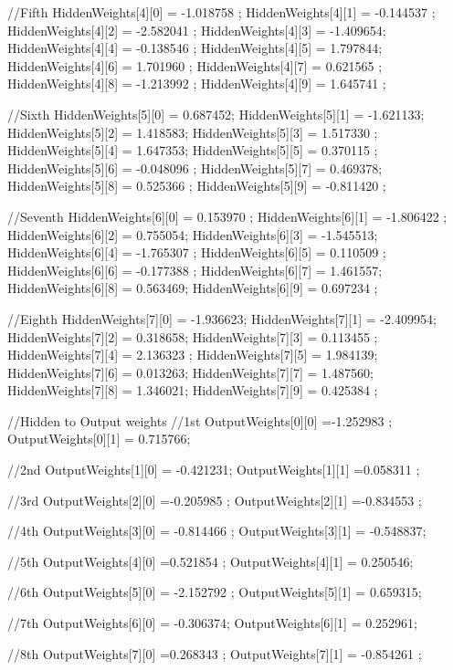 \documentclass[14pt,a4paper]{extarticle}
\begin{document}
\begin{spverbatim}
  //Fifth
  HiddenWeights[4][0] = -1.018758 ;
  HiddenWeights[4][1] = -0.144537 ;
  HiddenWeights[4][2] = -2.582041 ;
  HiddenWeights[4][3] =  -1.409654;
  HiddenWeights[4][4] = -0.138546 ;
  HiddenWeights[4][5] = 1.797844;
  HiddenWeights[4][6] = 1.701960 ;
  HiddenWeights[4][7] = 0.621565 ;
  HiddenWeights[4][8] = -1.213992 ;
  HiddenWeights[4][9] = 1.645741 ;

  //Sixth
  HiddenWeights[5][0] =  0.687452;
  HiddenWeights[5][1] =  -1.621133;
  HiddenWeights[5][2] =  1.418583;
  HiddenWeights[5][3] = 1.517330 ;
  HiddenWeights[5][4] =  1.647353;
  HiddenWeights[5][5] = 0.370115 ;
  HiddenWeights[5][6] = -0.048096 ;
  HiddenWeights[5][7] =  0.469378;
  HiddenWeights[5][8] = 0.525366 ;
  HiddenWeights[5][9] = -0.811420 ;

  //Seventh
  HiddenWeights[6][0] = 0.153970 ;
  HiddenWeights[6][1] = -1.806422 ;
  HiddenWeights[6][2] =  0.755054;
  HiddenWeights[6][3] =  -1.545513;
  HiddenWeights[6][4] = -1.765307 ;
  HiddenWeights[6][5] = 0.110509 ;
  HiddenWeights[6][6] = -0.177388 ;
  HiddenWeights[6][7] =  1.461557;
  HiddenWeights[6][8] =  0.563469;
  HiddenWeights[6][9] = 0.697234 ;

  //Eighth
  HiddenWeights[7][0] =  -1.936623;
  HiddenWeights[7][1] =  -2.409954;
  HiddenWeights[7][2] =  0.318658;
  HiddenWeights[7][3] = 0.113455 ;
  HiddenWeights[7][4] = 2.136323 ;
  HiddenWeights[7][5] =  1.984139;
  HiddenWeights[7][6] =  0.013263;
  HiddenWeights[7][7] =  1.487560;
  HiddenWeights[7][8] =  1.346021;
  HiddenWeights[7][9] = 0.425384 ;
  
  //Hidden to Output weights
  //1st
  OutputWeights[0][0] =-1.252983 ;
  OutputWeights[0][1] = 0.715766;

  //2nd
  OutputWeights[1][0] = -0.421231;
  OutputWeights[1][1] =0.058311 ;

  //3rd
  OutputWeights[2][0] =-0.205985 ;
  OutputWeights[2][1] =-0.834553 ;

  //4th
  OutputWeights[3][0] = -0.814466 ;
  OutputWeights[3][1] = -0.548837;

  //5th
  OutputWeights[4][0] =0.521854 ;
  OutputWeights[4][1] = 0.250546;

  //6th
  OutputWeights[5][0] = -2.152792 ;
  OutputWeights[5][1] = 0.659315;

  //7th
  OutputWeights[6][0] = -0.306374;
  OutputWeights[6][1] =  0.252961;

  //8th
  OutputWeights[7][0] =0.268343 ;
  OutputWeights[7][1] = -0.854261 ;


\end{spverbatim}
\end{document}
